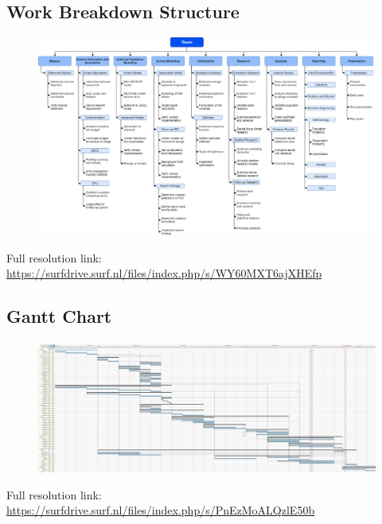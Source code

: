 \documentclass[12pt, english, NoHyper]{AE4010-template}
\begin{document}
\newpage
\appendix


\newpage
\begin{landscape}
 \section{Work Breakdown Structure}
 \label{sec:WBS}


\begin{figure}[h!]
 \includegraphics[width=1.0\textwidth]{figures/wbs.png}
\end{figure}
Full resolution link: \url{https://surfdrive.surf.nl/files/index.php/s/WY60MXT6ajXHEfp}
\end{landscape}
\newpage
\begin{landscape}
 \section{Gantt Chart}
 \label{sec:Gantt}


\begin{figure}[h!]
 \includegraphics[width=1.0\textwidth]{figures/thesis_rm.png}
\end{figure}
Full resolution link: \url{https://surfdrive.surf.nl/files/index.php/s/PnEzMoALQzlE50b}
\end{landscape}
\end{document}

